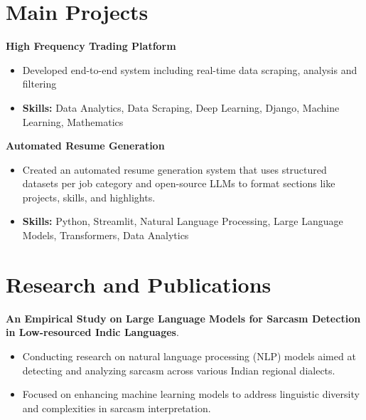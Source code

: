 \documentclass[a4paper,11pt]{article}
\begin{document}
\section{\textbf{Main Projects}}

\vspace{1mm}
  \textbf{High Frequency Trading Platform  }
\vspace{-1.5mm} %
\begin{itemize}
  \item Developed end-to-end system including real-time data scraping, analysis and filtering
\vspace{-3mm}
  \item \textbf{Skills:} Data Analytics, Data Scraping, Deep Learning, Django, Machine Learning, Mathematics
\end{itemize}


\vspace{1mm}
   \textbf{Automated Resume Generation }
\vspace{-1.5mm} %
\begin{itemize}
  \item Created an automated resume generation system that uses structured datasets per job category and open-source LLMs to format sections like projects, skills, and highlights.
\vspace{-3mm}
  \item \textbf{Skills:} Python, Streamlit, Natural Language Processing, Large Language Models, Transformers, Data Analytics
\end{itemize}



\section{\textbf{Research and Publications} \hfill }
\vspace{1mm}
  \textbf{An Empirical Study on Large Language Models for Sarcasm Detection in Low-resourced Indic Languages}.
\vspace{-1mm} %
\begin{itemize}
  \item Conducting research on natural language processing (NLP) models aimed at detecting and analyzing sarcasm across various Indian regional dialects.
\vspace{-3mm}
  \item Focused on enhancing machine learning models to address linguistic diversity and complexities in sarcasm interpretation.
\end{itemize}
\end{document}
